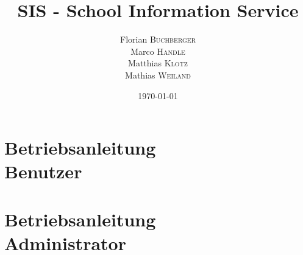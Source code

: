 \documentclass[12pt, oneside, titlepage, a4paper]{book}
\title{SIS - School Information Service}
\author{Florian \textsc{Buchberger}\\Marco \textsc{Handle}\\Matthias \textsc{Klotz}\\Mathias \textsc{Weiland}}
\date{\today}
\begin{document}
\frontmatter
\maketitle

\tableofcontents



\mainmatter




\chapter[Anleitungen: Benutzer]{Betriebsanleitung\\ Benutzer}

\chapter[Anleitungen: Administrator]{Betriebsanleitung\\ Administrator}









\listoffigures
\listoftables 

\backmatter 
\end{document}
